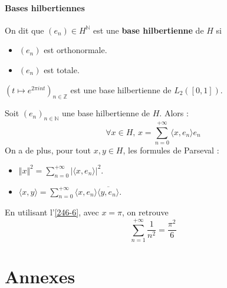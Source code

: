 	\paragraph{Bases hilbertiennes}


	\begin{definition}
		On dit que $(e_n) \in H^{\mathbb{N}}$ est une \textbf{base hilbertienne} de $H$ si
		\begin{itemize}
			\item $(e_n)$ est orthonormale.
			\item $(e_n)$ est totale.
		\end{itemize}
	\end{definition}

	\begin{example}
		$(t \mapsto e^{2\pi int})_{n \in \mathbb{Z}}$ est une base hilbertienne de $L_2([0,1])$.
	\end{example}

	\begin{theorem}
		Soit $(e_n)_{n \in \mathbb{N}}$ une base hilbertienne de $H$. Alors :
		\[ \forall x \in H, \, x = \sum_{n=0}^{+\infty} \langle x, e_n \rangle e_n \]
		On a de plus, pour tout $x, y \in H$, les formules de Parseval :
		\begin{itemize}
			\item $\Vert x \Vert^2 = \sum_{n=0}^{+\infty} \vert \langle x, e_n \rangle \vert^2$.
			\item $\langle x, y \rangle = \sum_{n=0}^{+\infty} \langle x, e_n \rangle \overline{\langle y, e_n \rangle}$.
		\end{itemize}
	\end{theorem}


  \begin{application}
    En utilisant l'\cref{246-6}, avec $x = \pi$, on retrouve
    \[ \sum_{n = 1}^{+\infty} \frac{1}{n^2} = \frac{\pi^2}{6} \]
  \end{application}

	\newpage
	\section*{Annexes}


